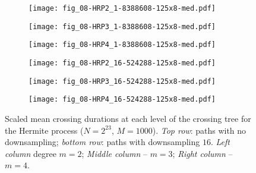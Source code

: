 \documentclass[a4paper]{extarticle}
\begin{document}
\begin{figure}[ht]
  \centering
  \begin{subfigure}[b]{0.3\textwidth}
    \texttt{[image: fig\_08-HRP2\_1-8388608-125x8-med.pdf]}
  \end{subfigure}\hspace{-2.em}
  \begin{subfigure}[b]{0.3\textwidth}
    \texttt{[image: fig\_08-HRP3\_1-8388608-125x8-med.pdf]}
  \end{subfigure}\hspace{-2.em}
  \begin{subfigure}[b]{0.3\textwidth}
    \texttt{[image: fig\_08-HRP4\_1-8388608-125x8-med.pdf]}
  \end{subfigure}\vspace{-1.0em}

  \begin{subfigure}[b]{0.3\textwidth}
    \texttt{[image: fig\_08-HRP2\_16-524288-125x8-med.pdf]}
  \end{subfigure}\hspace{-2.em}
  \begin{subfigure}[b]{0.3\textwidth}
    \texttt{[image: fig\_08-HRP3\_16-524288-125x8-med.pdf]}
  \end{subfigure}\hspace{-2.em}
  \begin{subfigure}[b]{0.3\textwidth}
    \texttt{[image: fig\_08-HRP4\_16-524288-125x8-med.pdf]}
  \end{subfigure}\vspace{-.5em}

  \caption{Scaled mean crossing durations at each level of the crossing tree for the Hermite process
  ($N = 2^{23}$, $M=1000$). \emph{Top row}: paths with no downsampling; \emph{bottom row}: paths with
  downsampling $16$. \emph{Left column} degree $m=2$; \emph{Middle column} -- $m=3$;
  \emph{Right column} -- $m=4$.}
  \label{fig:hrp_durations}
\end{figure}

\clearpage

\end{document}
